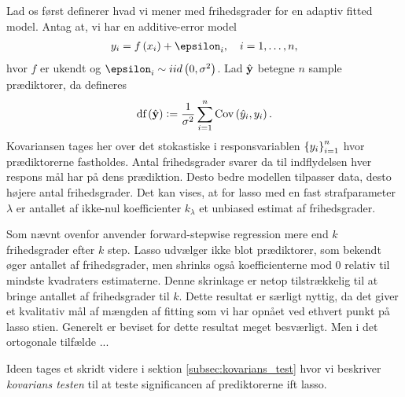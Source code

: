 Lad os først definerer hvad vi mener med frihedsgrader for en adaptiv fitted model. 
Antag at, vi har en additive-error model
\begin{align*}
y_i = f \del{x_i} + \epsilon_i, \quad i = 1, \ldots, n,
\end{align*}
hvor \(f\) er ukendt og \(\epsilon_i \sim iid \del{0, \sigma^2}\).
Lad \(\hat{\mathbf{y}}\) betegne \(n\) sample prædiktorer, da defineres 
\begin{align}
\text{df}\del{\hat{\y}} := \frac{1}{\sigma^2} \sum_{i=1}^n \text{Cov}\del{\hat{y}_i, y_i}. \label{eq:df_lasso}
\end{align}
Kovariansen tages her over det stokastiske i responsvariablen \(\cbr{y_i}_{i=1}^n\) hvor prædiktorerne fastholdes.
Antal frihedsgrader svarer da til indflydelsen hver respons mål har på dens prædiktion.
Desto bedre modellen tilpasser data, desto højere antal frihedsgrader.
Det kan vises, at for lasso med en fast strafparameter \(\lambda\) er antallet af ikke-nul koefficienter \(k_\lambda\) et unbiased estimat af frihedsgrader.

Som nævnt ovenfor anvender forward-stepwise regression mere end \(k\) frihedsgrader efter \(k\) step.
Lasso udvælger ikke blot prædiktorer, som bekendt øger antallet af frihedsgrader, men shrinks også koefficienterne mod 0 relativ til mindste kvadraters estimaterne.
Denne skrinkage er netop tilstrækkelig til at bringe antallet af frihedsgrader til \(k\).
Dette resultat er særligt nyttig, da det giver et kvalitativ mål af mængden af fitting som vi har opnået ved ethvert punkt på lasso stien.
Generelt er beviset for dette resultat meget besværligt.
Men i det ortogonale tilfælde ...

Ideen tages et skridt videre i sektion \ref{subsec:kovarians_test} hvor vi beskriver \textit{kovarians testen} til at teste significancen af prediktorerne ift lasso.
